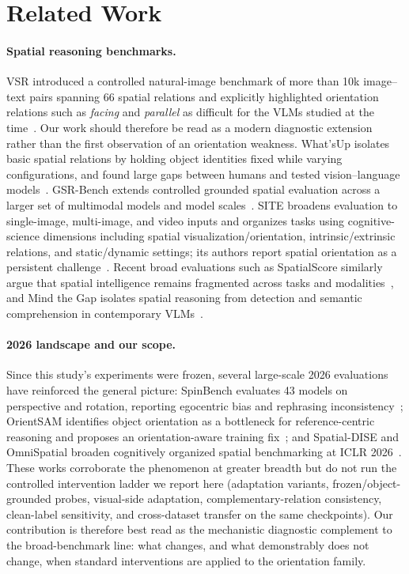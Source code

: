 \section{Related Work}
\label{sec:related}
\paragraph{Spatial reasoning benchmarks.}
VSR introduced a controlled natural-image benchmark of more than 10k image--text pairs spanning 66 spatial relations and explicitly highlighted orientation relations such as \emph{facing} and \emph{parallel} as difficult for the VLMs studied at the time~\cite{liu2023vsr}. Our work should therefore be read as a modern diagnostic extension rather than the first observation of an orientation weakness. What'sUp isolates basic spatial relations by holding object identities fixed while varying configurations, and found large gaps between humans and tested vision--language models~\cite{kamath2023whatsup}. GSR-Bench extends controlled grounded spatial evaluation across a larger set of multimodal models and model scales~\cite{rajabi2024gsrbench}. SITE broadens evaluation to single-image, multi-image, and video inputs and organizes tasks using cognitive-science dimensions including spatial visualization/orientation, intrinsic/extrinsic relations, and static/dynamic settings; its authors report spatial orientation as a persistent challenge~\cite{wang2025site}. Recent broad evaluations such as SpatialScore similarly argue that spatial intelligence remains fragmented across tasks and modalities~\cite{wu2026spatialscore}, and Mind the Gap isolates spatial reasoning from detection and semantic comprehension in contemporary VLMs~\cite{stogiannidis2025mindgap}.

\paragraph{2026 landscape and our scope.}
Since this study's experiments were frozen, several large-scale 2026 evaluations have reinforced the general picture: SpinBench evaluates 43 models on perspective and rotation, reporting egocentric bias and rephrasing inconsistency~\cite{yin2026spinbench}; OrientSAM identifies object orientation as a bottleneck for reference-centric reasoning and proposes an orientation-aware training fix~\cite{orientsam2026}; and Spatial-DISE and OmniSpatial broaden cognitively organized spatial benchmarking at ICLR 2026~\cite{spatialdise2026,omnispatial2026}. These works corroborate the phenomenon at greater breadth but do not run the controlled intervention ladder we report here (adaptation variants, frozen/object-grounded probes, visual-side adaptation, complementary-relation consistency, clean-label sensitivity, and cross-dataset transfer on the same checkpoints). Our contribution is therefore best read as the mechanistic diagnostic complement to the broad-benchmark line: what changes, and what demonstrably does not change, when standard interventions are applied to the orientation family.

